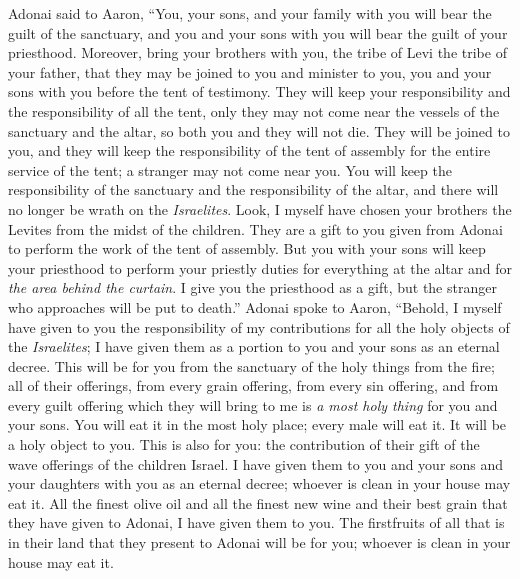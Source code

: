 \begin{biblechapter} %
 Adonai said to Aaron, “You, your sons, and your family with you will bear the guilt of the sanctuary, and you and your sons with you will bear the guilt of your priesthood.
\verse Moreover, bring your brothers with you, the tribe of Levi the tribe of your father, that they may be joined to you and minister to you, you and your sons with you before the tent of testimony.
\verse They will keep your responsibility and the responsibility of all the tent, only they may not come near the vessels of the sanctuary and the altar, so both you and they will not die.
\verse They will be joined to you, and they will keep the responsibility of the tent of assembly for the entire service of the tent; a stranger may not come near you.
\verse You will keep the responsibility of the sanctuary and the responsibility of the altar, and there will no longer be wrath on the \textit{Israelites}.
\verse Look, I myself have chosen your brothers the Levites from the midst of the children. They are a gift to you given from Adonai to perform the work of the tent of assembly.
\verse But you with your sons will keep your priesthood to perform your priestly duties for everything at the altar and for \textit{the area behind the curtain}. I give you the priesthood as a gift, but the stranger who approaches will be put to death.”
 Adonai spoke to Aaron, “Behold, I myself have given to you the responsibility of my contributions for all the holy objects of the \textit{Israelites}; I have given them as a portion to you and your sons as an eternal decree.
\verse This will be for you from the sanctuary of the holy things from the fire; all of their offerings, from every grain offering, from every sin offering, and from every guilt offering which they will bring to me is \textit{a most holy thing} for you and your sons.
\verse You will eat it in the most holy place; every male will eat it. It will be a holy object to you.
\verse This is also for you: the contribution of their gift of the wave offerings of the children Israel. I have given them to you and your sons and your daughters with you as an eternal decree; whoever is clean in your house may eat it.
\verse All the finest olive oil and all the finest new wine and their best grain that they have given to Adonai, I have given them to you.
\verse The firstfruits of all that is in their land that they present to Adonai will be for you; whoever is clean in your house may eat it.

\end{biblechapter}
